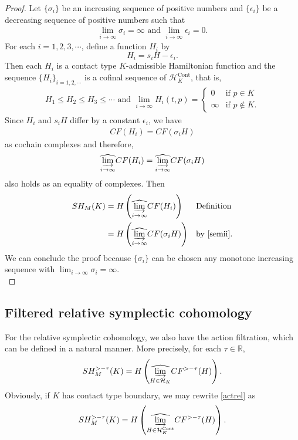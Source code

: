 \documentclass[12pt]{amsart}
\theoremstyle{definition}
\newcommand{\RR}{{\mathbb R}}
\begin{document}
\begin{proof}
Let $\{\sigma_i\}$ be an increasing sequence of positive numbers and $\{\epsilon_i\}$ be a decreasing sequence of positive numbers such that
\begin{align*}
    \lim_{i \to \infty} \sigma_i = \infty\,\,\textrm{and}\,\,\lim_{i \to \infty} \epsilon_i = 0.
\end{align*}
For each $i=1,2,3,\cdots$, define a function $H_i$ by $$H_i = s_iH - \epsilon_i.$$ Then each $H_i$ is a contact type $K$-admissible Hamiltonian function and the sequence $\{H_i\}_{i=1,2,\cdots}$ is a cofinal sequence of $\mathcal{H}_K^{\text{Cont}}$, that is, 
\begin{align*}
H_1\leq H_2\leq H_3\leq \cdots\,\,\textrm{and}\,\,
    \lim_{i \to \infty}H_i(t,p) = \begin{cases}
        0&\textrm{if}\,\,p \in K\\
        \infty &\textrm{if}\,\,p \notin K.
    \end{cases}
\end{align*}
Since $H_i$ and $s_iH$ differ by a constant $\epsilon_i$, we have
\begin{align*}
    CF(H_i) = CF(\sigma_iH)    
\end{align*}
as cochain complexes and therefore,
\begin{align}\label{semii}
    \widehat{\varinjlim_{i \to \infty}} CF(H_i) = \widehat{\varinjlim_{i \to \infty}} CF(\sigma_iH)
\end{align}
also holds as an equality of complexes. Then
\begin{align*}
    SH_M(K) &= H \left( \widehat{\varinjlim_{i \to \infty}} CF(H_i) \right)&&\textrm{Definition}\\& = H \left( \widehat{\varinjlim_{i \to \infty}} CF(\sigma_iH) \right)&&\textrm{by}\,\,\eqref{semii}.
\end{align*}
We can conclude the proof because $\{\sigma_i\}$ can be chosen any monotone increasing sequence with $\displaystyle\lim_{i \to \infty}\sigma_i = \infty$. \\    
\end{proof}
\vspace{0.2 cm}
\subsection{Filtered relative symplectic cohomology}
For the relative symplectic cohomology, we also have the action filtration, which can be defined in a natural manner. More precisely, for each $\tau \in \RR$,
\begin{align}\label{actrel}
    SH_M^{>-\tau}(K) = H \left( \widehat{\varinjlim_{H \in \mathcal{H}_K}} CF^{>-\tau}(H)  \right).
\end{align}
Obviously, if $K$ has contact type boundary, we may rewrite \eqref{actrel} as
\begin{align*}
    SH_M^{>-\tau}(K) = H \left( \widehat{\varinjlim_{H \in \mathcal{H}^{\text{Cont}}_K}} CF^{>-\tau}(H)  \right).
\end{align*}
\end{document}
